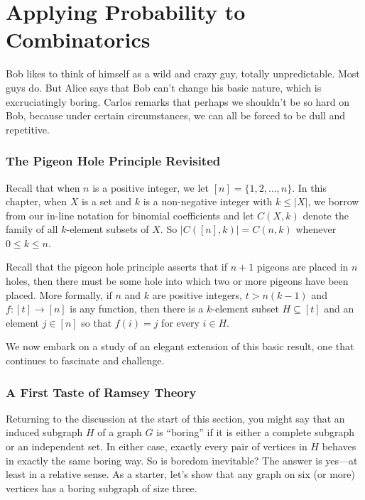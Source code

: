 
\chapter{Applying Probability to Combinatorics}\label{ch:probmeth}

Bob likes to think of himself as a wild and crazy guy, totally 
unpredictable.  Most guys do.  But Alice says that Bob
can't change his basic nature, which is excruciatingly
boring.  Carlos remarks that perhaps we shouldn't be
so hard on Bob, because under certain circumstances, we
can all be forced to be dull and repetitive. 

\subsection{The Pigeon Hole Principle Revisited}\label{s:ramsey:php-revisit}

Recall that when $n$ is a positive integer, 
we let $[n]=\{1,2,\dots,n\}$.  In this chapter, when $X$ is
a set and $k$ is a non-negative integer with $k\le |X|$, we
borrow from our in-line notation for binomial coefficients
and let $C(X,k)$ denote the family of all $k$-element subsets
of $X$.  So $|C([n],k)|=C(n,k)$ whenever $0\le k\le n$.

Recall that the pigeon hole principle asserts that if
$n+1$ pigeons are placed in $n$ holes, then there must
be some hole into which two or more pigeons have been
placed.  More formally, if $n$ and $k$ are positive integers,
$t>n(k-1)$ and $f:[t]\longrightarrow[n]$ is any function,
then there is a $k$-element subset $H\subseteq [t]$ and
an element $j\in[n]$ so that $f(i)=j$ for every $i\in H$.

We now embark on a study of an elegant extension of this
basic result, one that continues to fascinate and challenge.

\subsection{A First Taste of Ramsey Theory}

Returning to the discussion at the start of this section,
you might say that an induced subgraph $H$ of a graph $G$ is
``boring'' if it is either a complete subgraph or
an independent set.  In either case, exactly every pair
of vertices in $H$ behaves in exactly the same boring way.
So is boredom inevitable?  The answer is yes---at least
in a relative sense.  As a starter, let's show that
any graph on six (or more) vertices has a boring subgraph
of size three.

